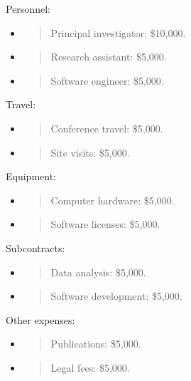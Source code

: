 Personnel:

\begin{itemize}
\item
  \begin{quote}
  Principal investigator: \$10,000.
  \end{quote}
\item
  \begin{quote}
  Research assistant: \$5,000.
  \end{quote}
\item
  \begin{quote}
  Software engineer: \$5,000.
  \end{quote}
\end{itemize}

Travel:

\begin{itemize}
\item
  \begin{quote}
  Conference travel: \$5,000.
  \end{quote}
\item
  \begin{quote}
  Site visits: \$5,000.
  \end{quote}
\end{itemize}

Equipment:

\begin{itemize}
\item
  \begin{quote}
  Computer hardware: \$5,000.
  \end{quote}
\item
  \begin{quote}
  Software licenses: \$5,000.
  \end{quote}
\end{itemize}

Subcontracts:

\begin{itemize}
\item
  \begin{quote}
  Data analysis: \$5,000.
  \end{quote}
\item
  \begin{quote}
  Software development: \$5,000.
  \end{quote}
\end{itemize}

Other expenses:

\begin{itemize}
\item
  \begin{quote}
  Publications: \$5,000.
  \end{quote}
\item
  \begin{quote}
  Legal fees: \$5,000.
  \end{quote}
\end{itemize}


